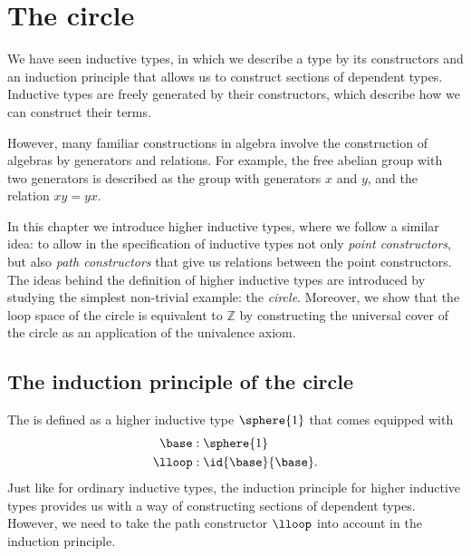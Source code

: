 \chapter{The circle}

We have seen inductive types, in which we describe a type by its constructors and an induction principle that allows us to construct sections of dependent types. Inductive types are freely generated by their constructors, which describe how we can construct their terms. 

However, many familiar constructions in algebra involve the construction of algebras by generators and relations. 
For example, the free abelian group with two generators is described as the group with generators $x$ and $y$, and the relation $xy=yx$. 

In this chapter we introduce higher inductive types, where we follow a similar idea: to allow in the specification of inductive types not only \emph{point constructors}, but also \emph{path constructors} that give us relations between the point constructors. 
The ideas behind the definition of higher inductive types are introduced by studying the simplest non-trivial example: the \emph{circle}.
Moreover, we show that the loop space of the circle is equivalent to $\mathbb{Z}$ by constructing the universal cover of the circle as an application of the univalence axiom. 

\section{The induction principle of the circle}
The  is defined as a higher inductive type $\sphere{1}$ that comes equipped with
\begin{align*}
\base & : \sphere{1} \\
\lloop & : \id{\base}{\base}.
\end{align*}
Just like for ordinary inductive types, the induction principle for higher inductive types provides us with a way of constructing sections of dependent types. However, we need to take the path constructor $\lloop$ into account in the induction principle. 

